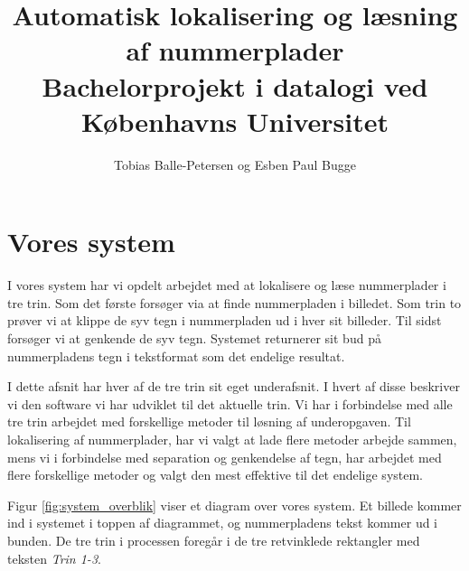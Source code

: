 \documentclass[11pt,a4paper,final]{article}
\author{Tobias Balle-Petersen og Esben Paul Bugge}
\title{Automatisk lokalisering og læsning af nummerplader\\\large{Bachelorprojekt i datalogi ved Københavns Universitet}}
\begin{document}
\maketitle
\newpage
\tableofcontents
\newpage


\section{Vores system}
I vores system har vi opdelt arbejdet med at lokalisere og læse nummerplader i tre trin. Som det første forsøger via at finde nummerpladen i billedet. Som trin to prøver vi at klippe de syv tegn i nummerpladen ud i hver sit billeder. Til sidst forsøger vi at genkende de syv tegn. Systemet returnerer sit bud på nummerpladens tegn i tekstformat som det endelige resultat.

I dette afsnit har hver af de tre trin sit eget underafsnit. I hvert af disse beskriver vi den software vi har udviklet til det aktuelle trin. Vi har i forbindelse med alle tre trin arbejdet med forskellige metoder til løsning af underopgaven. Til lokalisering af nummerplader, har vi valgt at lade flere metoder arbejde sammen, mens vi i forbindelse med separation og genkendelse af tegn, har arbejdet med flere forskellige metoder og valgt den mest effektive til det endelige system.

 Figur \ref{fig:system_overblik} viser et diagram over vores system. Et billede kommer ind i systemet i toppen af diagrammet, og nummerpladens tekst kommer ud i bunden. De tre trin i processen foregår i de tre retvinklede rektangler med teksten \textit{Trin 1-3}. 
\end{document}
